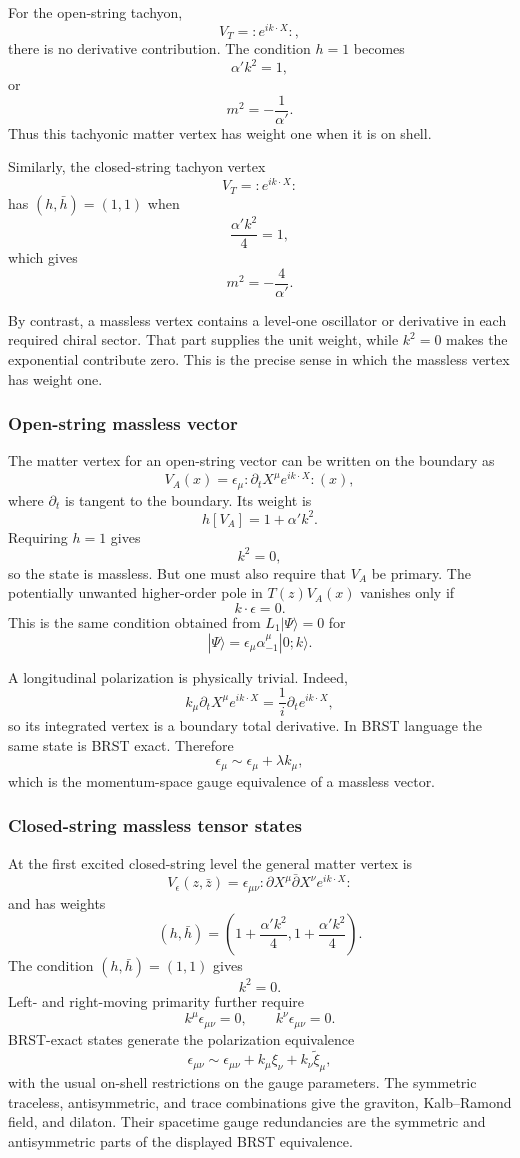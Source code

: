 \documentclass[
  10pt,
  a4paper,
  openany]{book}
\begin{document}
For the open-string tachyon, \[
V_T=:e^{ik\cdot X}:,
\] there is no derivative contribution. The condition \(h=1\) becomes \[
\alpha'k^2=1,
\] or \[
m^2=-\frac1{\alpha'}.
\] Thus this tachyonic matter vertex has weight one when it is on shell.

Similarly, the closed-string tachyon vertex \[
V_T=:e^{ik\cdot X}:
\] has \((h,\bar h)=(1,1)\) when \[
\frac{\alpha'k^2}{4}=1,
\] which gives \[
m^2=-\frac4{\alpha'}.
\]

By contrast, a massless vertex contains a level-one oscillator or
derivative in each required chiral sector. That part supplies the unit
weight, while \(k^2=0\) makes the exponential contribute zero. This is
the precise sense in which the massless vertex has weight one.

\subsubsection{Open-string massless
vector}\label{open-string-massless-vector}

The matter vertex for an open-string vector can be written on the
boundary as \[
V_A(x)=\epsilon_\mu:\!\partial_tX^\mu e^{ik\cdot X}\!:(x),
\] where \(\partial_t\) is tangent to the boundary. Its weight is \[
h[V_A]=1+\alpha'k^2.
\] Requiring \(h=1\) gives \[
k^2=0,
\] so the state is massless. But one must also require that \(V_A\) be
primary. The potentially unwanted higher-order pole in \(T(z)V_A(x)\)
vanishes only if \[
k\cdot\epsilon=0.
\] This is the same condition obtained from \(L_1|\Psi\rangle=0\) for \[
|\Psi\rangle=\epsilon_\mu\alpha_{-1}^\mu|0;k\rangle.
\]

A longitudinal polarization is physically trivial. Indeed, \[
k_\mu\partial_tX^\mu e^{ik\cdot X}
=\frac1{i}\partial_t e^{ik\cdot X},
\] so its integrated vertex is a boundary total derivative. In BRST
language the same state is BRST exact. Therefore \[
\epsilon_\mu\sim\epsilon_\mu+\lambda k_\mu,
\] which is the momentum-space gauge equivalence of a massless vector.

\subsubsection{Closed-string massless tensor
states}\label{closed-string-massless-tensor-states}

At the first excited closed-string level the general matter vertex is \[
V_\epsilon(z,\bar z)
=\epsilon_{\mu\nu}:
\partial X^\mu\bar\partial X^\nu e^{ik\cdot X}:
\] and has weights \[
(h,\bar h)
=\left(1+\frac{\alpha'k^2}{4},
1+\frac{\alpha'k^2}{4}\right).
\] The condition \((h,\bar h)=(1,1)\) gives \[
k^2=0.
\] Left- and right-moving primarity further require \[
k^\mu\epsilon_{\mu\nu}=0,
\qquad
k^\nu\epsilon_{\mu\nu}=0.
\] BRST-exact states generate the polarization equivalence \[
\epsilon_{\mu\nu}
\sim
\epsilon_{\mu\nu}
+k_\mu\xi_\nu
+k_\nu\widetilde\xi_\mu,
\] with the usual on-shell restrictions on the gauge parameters. The
symmetric traceless, antisymmetric, and trace combinations give the
graviton, Kalb--Ramond field, and dilaton. Their spacetime gauge
redundancies are the symmetric and antisymmetric parts of the displayed
BRST equivalence.
\end{document}
